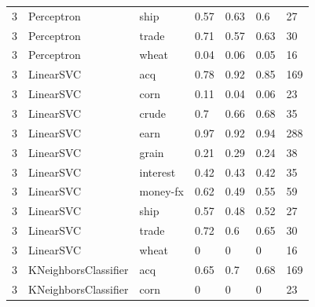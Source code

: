 \documentclass{article}
\begin{document}
\begin{table}[h]
\begin{tabular}{lllllll}
3             & Perceptron             & ship            & 0.57               & 0.63            & 0.6               & 27               \\
3             & Perceptron             & trade           & 0.71               & 0.57            & 0.63              & 30               \\
3             & Perceptron             & wheat           & 0.04               & 0.06            & 0.05              & 16               \\
3             & LinearSVC              & acq             & 0.78               & 0.92            & 0.85              & 169              \\
3             & LinearSVC              & corn            & 0.11               & 0.04            & 0.06              & 23               \\
3             & LinearSVC              & crude           & 0.7                & 0.66            & 0.68              & 35               \\
3             & LinearSVC              & earn            & 0.97               & 0.92            & 0.94              & 288              \\
3             & LinearSVC              & grain           & 0.21               & 0.29            & 0.24              & 38               \\
3             & LinearSVC              & interest        & 0.42               & 0.43            & 0.42              & 35               \\
3             & LinearSVC              & money-fx        & 0.62               & 0.49            & 0.55              & 59               \\
3             & LinearSVC              & ship            & 0.57               & 0.48            & 0.52              & 27               \\
3             & LinearSVC              & trade           & 0.72               & 0.6             & 0.65              & 30               \\
3             & LinearSVC              & wheat           & 0                  & 0               & 0                 & 16               \\
3             & KNeighborsClassifier   & acq             & 0.65               & 0.7             & 0.68              & 169              \\
3             & KNeighborsClassifier   & corn            & 0                  & 0               & 0                 & 23               \\

\end{tabular}
\end{table}
\end{document}

